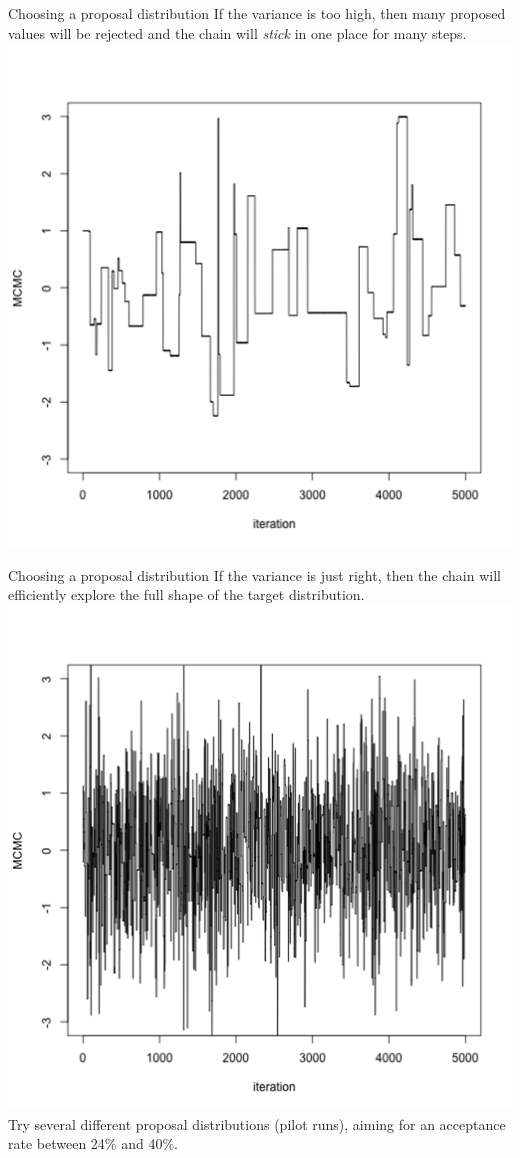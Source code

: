 \documentclass[compress]{beamer}
\begin{document}
\begin{frame}[label=sec-8-5]{Choosing a proposal distribution}
If the variance is too high, then many proposed values will be rejected and the chain will \textit{stick} in one place for many steps.
\includegraphics[width=1\linewidth]{Var2}
\end{frame}

\begin{frame}[label=sec-8-6]{Choosing a proposal distribution}
If the variance is just right, then the chain will efficiently explore the full shape of the target distribution.
\includegraphics[width=1\linewidth]{Var3}
Try several different proposal distributions (\alert{pilot runs}), aiming for an acceptance rate between 24\%  and 40\%. 
\end{frame}
\end{document}
